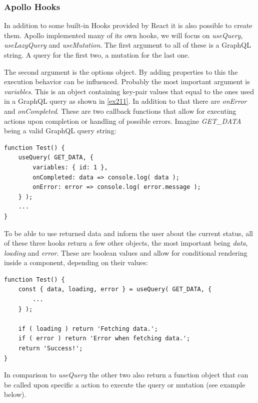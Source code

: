 \subsubsection{Apollo Hooks}
In addition to some built-in Hooks provided by React it is also possible to create them. Apollo implemented many of its own hooks, we will focus on \emph{useQuery}, \emph{useLazyQuery} and \emph{useMutation}.
The first argument to all of these is a GraphQL string. A query for the first two, a mutation for the last one.

The second argument is the options object. By adding properties to this the execution behavior can be influenced. Probably the most important argument is \emph{variables}. This is an object containing key-pair values that equal to the ones used in a GraphQL query as shown in \autoref{ex211}. In addition to that there are \emph{onError} and \emph{onCompleted}. These are two callback functions that allow for executing actions upon completion or handling of possible errors. Imagine \emph{GET\_DATA} being a valid GraphQL query string:
\begin{lstlisting}[caption={The useQuery Hook from Apollo}]
function Test() {
	useQuery( GET_DATA, {
		variables: { id: 1 },
		onCompleted: data => console.log( data );
		onError: error => console.log( error.message );
	} );
	...
}
\end{lstlisting}


To be able to use returned data and inform the user about the current status, all of these three hooks return a few other objects, the most important being \emph{data}, \emph{loading} and \emph{error}. These are boolean values and allow for conditional rendering inside a component, depending on their values: 
\begin{lstlisting}[caption={Demonstration of the useQuery Hook}]
function Test() {
	const { data, loading, error } = useQuery( GET_DATA, {
		...	
	} );
	
	if ( loading ) return 'Fetching data.';
	if ( error ) return 'Error when fetching data.';
	return 'Success!';
}
\end{lstlisting}

In comparison to \emph{useQuery} the other two also return a function object that can be called upon specific a action to execute the query or mutation (see example below).

